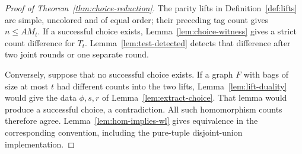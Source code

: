 \begin{proof}[Proof of Theorem~\ref{thm:choice-reduction}]
The parity lifts in Definition~\ref{def:lifts} are simple, uncolored and
of equal order; their preceding tag count gives \(n\le A M_t\).
If a successful choice exists, Lemma~\ref{lem:choice-witness} gives a
strict count difference for \(T_t\). Lemma~\ref{lem:test-detected}
detects that difference after two joint rounds or one separate round.

Conversely, suppose that no successful choice exists. If a graph \(F\)
with bags of size at most \(t\) had different counts into the two lifts,
Lemma~\ref{lem:lift-duality} would give the data \(\phi,s,r\) of
Lemma~\ref{lem:extract-choice}. That lemma would produce a successful
choice, a contradiction. All such homomorphism counts therefore agree.
Lemma~\ref{lem:hom-implies-wl} gives equivalence in the corresponding
convention, including the pure-tuple disjoint-union implementation.
\end{proof}
